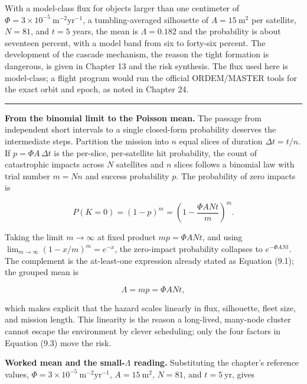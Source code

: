 \documentclass[
  11pt,
  openany,
  oneside]{book}
\begin{document}
With a model-class flux for objects larger than one centimeter of
\(\Phi = 3\times10^{-5}\
\mathrm{m^{-2}yr^{-1}}\), a tumbling-averaged silhouette of
\(A = 15\ \mathrm{m^2}\) per satellite, \(N = 81\), and \(t = 5\) years,
the mean is \(\Lambda = 0.182\) and the probability is about seventeen
percent, with a model band from six to forty-six percent. The
development of the cascade mechanism, the reason the tight formation is
dangerous, is given in Chapter 13 and the risk synthesis. The flux used
here is model-class; a flight program would run the official
ORDEM/MASTER tools for the exact orbit and epoch, as noted in Chapter
24.

\begin{center}\rule{0.5\linewidth}{0.5pt}\end{center}

\textbf{From the binomial limit to the Poisson mean.} The passage from
independent short intervals to a single closed-form probability deserves
the intermediate steps. Partition the mission into \(n\) equal slices of
duration \(\Delta t = t/n\). If \(p = \Phi A\,\Delta t\) is the
per-slice, per-satellite hit probability, the count of catastrophic
impacts across \(N\) satellites and \(n\) slices follows a binomial law
with trial number \(m = Nn\) and success probability \(p\). The
probability of zero impacts is

\begin{equation}
P(K = 0) = (1 - p)^{m} = \left(1 - \frac{\Phi A N t}{m}\right)^{m}. \tag{9.2}
\end{equation}

Taking the limit \(m \to \infty\) at fixed product \(mp = \Phi A N t\),
and using \(\lim_{m\to\infty}(1 - x/m)^{m} = e^{-x}\), the zero-impact
probability collapses to \(e^{-\Phi A N t}\). The complement is the
at-least-one expression already stated as Equation (9.1); the grouped
mean is

\begin{equation}
\Lambda = m p = \Phi A N t, \tag{9.3}
\end{equation}

which makes explicit that the hazard scales linearly in flux,
silhouette, fleet size, and mission length. This linearity is the reason
a long-lived, many-node cluster cannot escape the environment by clever
scheduling; only the four factors in Equation (9.3) move the risk.

\textbf{Worked mean and the small-\(\Lambda\) reading.} Substituting the
chapter's reference values,
\(\Phi = 3\times10^{-5}\ \mathrm{m^{-2}yr^{-1}}\),
\(A = 15\ \mathrm{m^2}\), \(N = 81\), and \(t = 5\ \mathrm{yr}\), gives
\end{document}
